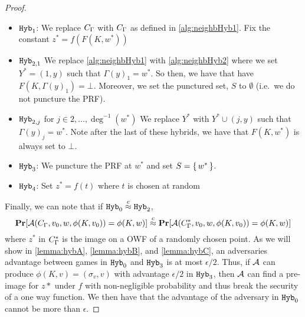 \begin{lemma}
\begin{proof}
\begin{itemize}
			\item $\texttt{Hyb}_1$: We replace $C_\Gamma$ with $C_\Gamma$ as defined in \ref{alg:neighbHyb1}.
			Fix the constant $z^* = f(F(K, w^*))$
			\item $\texttt{Hyb}_{2, 1}$
			We replace \cref{alg:neighbHyb1} with \cref{alg:neighbHyb2} where we 
			set $Y^* = (1, y)$ such that $\Gamma(y)_1 = w^*$. So then, we have that
			have $F(K, \Gamma(y)_1) = \bot$. Moreover, we set the punctured set, $S$ to $\emptyset$ (i.e.\ we do not puncture the PRF).
			\item $\texttt{Hyb}_{2, j}$ for $j \in 2, \dots, \deg^{-1}(w^*)$
			We replace $Y^*$ with $Y^* \cup (j, y)$ such that $\Gamma(y)_j = w^*$.
			Note after the last of these hybrids, we have that $F(K, w^*)$ is always set to $\bot$.
			\item $\texttt{Hyb}_3$: We puncture the PRF at $w^*$ and set $S = \set{w^*}$.
			\item $\texttt{Hyb}_4$: Set $z^* = f(t)$ where $t$ is chosen at random %
		\end{itemize}
		Finally, we can note that if $\texttt{Hyb}_0 \overset{c}{\approx} \texttt{Hyb}_2$,
		\begin{equation*}
			\operatorname*{\mathbf{Pr}}[\mathcal{A}(C_\Gamma, v_0, w, \phi(K, v_0)) = \phi(K, w)] 
			\overset{c}{\approx}
			\operatorname*{\mathbf{Pr}}[\mathcal{A}(C_\Gamma^*, v_0, w, \phi(K, v_0)) = \phi(K, w)]
		\end{equation*}
		where $z^*$ in $C_\Gamma^*$	is the image on a OWF of a randomly chosen point.
		As we will show in \cref{lemma:hybA}, \cref{lemma:hybB}, and \cref{lemma:hybC},
		an adversaries advantage between games in $\texttt{Hyb}_0$ and $\texttt{Hyb}_3$ is at most $\epsilon / 2$.
		Thus, if $\mathcal{A}$ can produce $\phi(K, v) = (\sigma_v, v)$ with advantage $\epsilon / 2$
		in $\texttt{Hyb}_3$, then $\mathcal{A}$
		can find a pre-image for $z*$ under $f$ with non-negligible probability and thus break the security of a one way function.
		We then have that the advantage of the adversary in $\texttt{Hyb}_0$ cannot be more than $\epsilon$.
	\end{proof}
\end{lemma}


